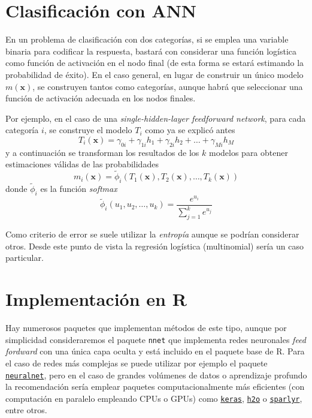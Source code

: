 \documentclass[
  spanish,
]{book}
\theoremstyle{break}
\theoremstyle{definition}
\theoremstyle{definition}
\theoremstyle{definition}
\theoremstyle{remark}
\begin{document}
\hypertarget{clasificaciuxf3n-con-ann}{%
\section{Clasificación con ANN}\label{clasificaciuxf3n-con-ann}}

En un problema de clasificación con dos categorías, si se emplea una variable binaria para codificar la respuesta, bastará con considerar una función logística como función de activación en el nodo final (de esta forma se estará estimando la probabilidad de éxito).
En el caso general, en lugar de construir un único modelo \(m(\mathbf{x})\), se construyen tantos como categorías, aunque habrá que seleccionar una función de activación adecuada en los nodos finales.

Por ejemplo, en el caso de una \emph{single-hidden-layer feedforward network}, para cada categoría \(i\), se construye el modelo \(T_i\) como ya se explicó antes
\[T_i(\mathbf{x}) = \gamma_{0i} + \gamma_{1i} h_1 + \gamma_{2i} h_2 + \ldots + \gamma_{Mi} h_M \]
y a continuación se transforman los resultados de los \(k\) modelos para obtener estimaciones válidas de las probabilidades
\[m_i(\mathbf{x}) = \tilde{\phi}_i (T_1(\mathbf{x}), T_2(\mathbf{x}),\ldots, T_k(\mathbf{x})) \]
donde \(\tilde{\phi}_i\) es la función \emph{softmax}
\[\tilde{\phi}_i (u_1,u_2,\ldots,u_k) = \frac{e^{u_i}}{\sum_{j=1}^k e^{u_j}}\]

Como criterio de error se suele utilizar la \emph{entropía} aunque se podrían considerar otros.
Desde este punto de vista la regresión logística (multinomial) sería un caso particular.

\hypertarget{implementaciuxf3n-en-r-2}{%
\section{Implementación en R}\label{implementaciuxf3n-en-r-2}}

Hay numerosos paquetes que implementan métodos de este tipo, aunque por simplicidad consideraremos el paquete \texttt{nnet} que implementa redes neuronales \emph{feed fordward} con una única capa oculta y está incluido en el paquete base de R.
Para el caso de redes más complejas se puede utilizar por ejemplo el paquete \href{https://CRAN.R-project.org/package=neuralnet}{\texttt{neuralnet}}, pero en el caso de grandes volúmenes de datos o aprendizaje profundo la recomendación sería emplear paquetes computacionalmente más eficientes (con computación en paralelo empleando CPUs o GPUs) como \href{https://keras.rstudio.com}{\texttt{keras}}, \href{https://github.com/h2oai/h2o-3}{\texttt{h2o}} o \href{https://spark.rstudio.com/}{\texttt{sparlyr}}, entre otros.
\end{document}
